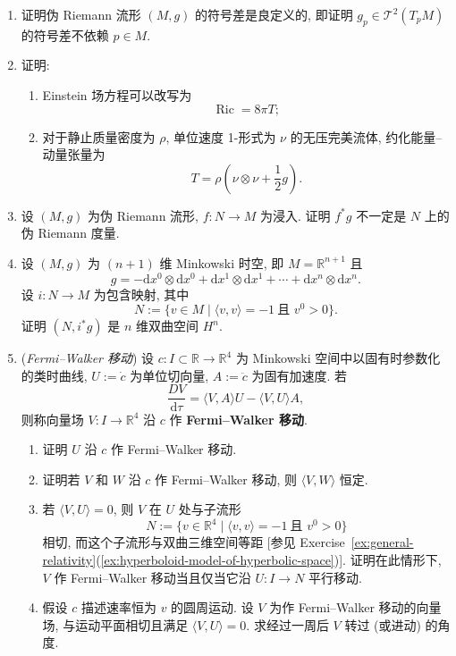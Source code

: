 \begin{RiemannExercise}\label{ex:general-relativity}
\begin{enumerate}[label=(\arabic*),ref=\arabic*,leftmargin=*]
\item\label{ex:signature-is-constant-on-pseudo-riemannian-manifold}
证明伪 Riemann 流形 $(M,g)$ 的符号差是良定义的, 即证明 $g_p\in\mathcal{T}^2(T_pM)$ 的符号差不依赖 $p\in M$.
\item\label{ex:trace-reversed-einstein-equation}
证明:
\begin{enumerate}[label=(\alph*),leftmargin=*]
\item Einstein 场方程可以改写为
\[
  \operatorname{Ric}=8\pi T;
\]
\item 对于静止质量密度为 $\rho$, 单位速度 1-形式为 $\nu$ 的无压完美流体, 约化能量--动量张量为
\[
  T=\rho\left(\nu\otimes\nu+\frac{1}{2}g\right).
\]
\end{enumerate}
\item\label{ex:pullback-of-pseudo-riemannian-metric-can-degenerate}
设 $(M,g)$ 为伪 Riemann 流形, $f:N\to M$ 为浸入. 证明 $f^*g$ 不一定是 $N$ 上的伪 Riemann 度量.
\item\label{ex:hyperboloid-model-of-hyperbolic-space}
设 $(M,g)$ 为 $(n+1)$ 维 Minkowski 时空, 即 $M=\mathbb{R}^{n+1}$ 且
\[
  g=-\mathrm{d}x^0\otimes\mathrm{d}x^0+\mathrm{d}x^1\otimes\mathrm{d}x^1
     +\cdots+\mathrm{d}x^n\otimes\mathrm{d}x^n.
\]
设 $i:N\to M$ 为包含映射, 其中
\[
  N:=\{v\in M\mid\langle v,v\rangle=-1\ \text{且 $v^0>0$}\}.
\]
证明 $(N,i^*g)$ 是 $n$ 维双曲空间 $H^n$.
\item\label{ex:fermi-walker-transport}
(\emph{Fermi–Walker 移动}) 设 $c:I\subset\mathbb{R}\to\mathbb{R}^4$ 为 Minkowski 空间中以固有时参数化的类时曲线, $U:=\dot c$ 为单位切向量, $A:=\ddot c$ 为固有加速度. 若
\[
  \frac{DV}{\mathrm{d}\tau}=\langle V,A\rangle U-\langle V,U\rangle A,
\]
则称向量场 $V:I\to\mathbb{R}^4$ 沿 $c$ 作 \textbf{Fermi–Walker 移动}.
\begin{enumerate}[label=(\alph*),leftmargin=*]
\item 证明 $U$ 沿 $c$ 作 Fermi–Walker 移动.
\item 证明若 $V$ 和 $W$ 沿 $c$ 作 Fermi–Walker 移动, 则 $\langle V,W\rangle$ 恒定.
\item 若 $\langle V,U\rangle=0$, 则 $V$ 在 $U$ 处与子流形
\[
  N:=\{v\in\mathbb{R}^4\mid\langle v,v\rangle=-1\ \text{且 $v^0>0$}\}
\]
相切, 而这个子流形与双曲三维空间等距 [参见 Exercise~\ref{ex:general-relativity}(\ref{ex:hyperboloid-model-of-hyperbolic-space})]. 证明在此情形下, $V$ 作 Fermi–Walker 移动当且仅当它沿 $U:I\to N$ 平行移动.
\item 假设 $c$ 描述速率恒为 $v$ 的圆周运动. 设 $V$ 为作 Fermi–Walker 移动的向量场, 与运动平面相切且满足 $\langle V,U\rangle=0$. 求经过一周后 $V$ 转过 (或进动) 的角度.


\end{enumerate}
\end{enumerate}
\end{RiemannExercise}
